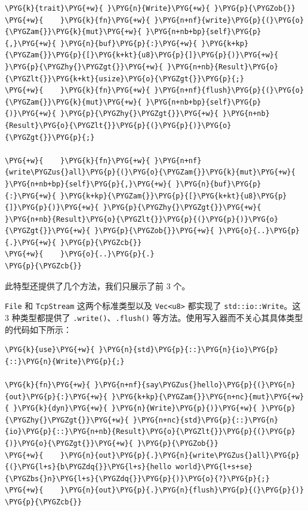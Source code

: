 \begin{Verbatim}[commandchars=\\\{\},breaklines=true,breakanywhere=true,fontsize=\codefont,xleftmargin=17bp]
\PYG{k}{trait}\PYG{+w}{ }\PYG{n}{Write}\PYG{+w}{ }\PYG{p}{\PYGZob{}}
\PYG{+w}{    }\PYG{k}{fn}\PYG{+w}{ }\PYG{n+nf}{write}\PYG{p}{(}\PYG{o}{\PYGZam{}}\PYG{k}{mut}\PYG{+w}{ }\PYG{n+nb+bp}{self}\PYG{p}{,}\PYG{+w}{ }\PYG{n}{buf}\PYG{p}{:}\PYG{+w}{ }\PYG{k+kp}{\PYGZam{}}\PYG{p}{[}\PYG{k+kt}{u8}\PYG{p}{]}\PYG{p}{)}\PYG{+w}{ }\PYG{p}{\PYGZhy{}\PYGZgt{}}\PYG{+w}{ }\PYG{n+nb}{Result}\PYG{o}{\PYGZlt{}}\PYG{k+kt}{usize}\PYG{o}{\PYGZgt{}}\PYG{p}{;}
\PYG{+w}{    }\PYG{k}{fn}\PYG{+w}{ }\PYG{n+nf}{flush}\PYG{p}{(}\PYG{o}{\PYGZam{}}\PYG{k}{mut}\PYG{+w}{ }\PYG{n+nb+bp}{self}\PYG{p}{)}\PYG{+w}{ }\PYG{p}{\PYGZhy{}\PYGZgt{}}\PYG{+w}{ }\PYG{n+nb}{Result}\PYG{o}{\PYGZlt{}}\PYG{p}{(}\PYG{p}{)}\PYG{o}{\PYGZgt{}}\PYG{p}{;}

\PYG{+w}{    }\PYG{k}{fn}\PYG{+w}{ }\PYG{n+nf}{write\PYGZus{}all}\PYG{p}{(}\PYG{o}{\PYGZam{}}\PYG{k}{mut}\PYG{+w}{ }\PYG{n+nb+bp}{self}\PYG{p}{,}\PYG{+w}{ }\PYG{n}{buf}\PYG{p}{:}\PYG{+w}{ }\PYG{k+kp}{\PYGZam{}}\PYG{p}{[}\PYG{k+kt}{u8}\PYG{p}{]}\PYG{p}{)}\PYG{+w}{ }\PYG{p}{\PYGZhy{}\PYGZgt{}}\PYG{+w}{ }\PYG{n+nb}{Result}\PYG{o}{\PYGZlt{}}\PYG{p}{(}\PYG{p}{)}\PYG{o}{\PYGZgt{}}\PYG{+w}{ }\PYG{p}{\PYGZob{}}\PYG{+w}{ }\PYG{o}{..}\PYG{p}{.}\PYG{+w}{ }\PYG{p}{\PYGZcb{}}
\PYG{+w}{    }\PYG{o}{..}\PYG{p}{.}
\PYG{p}{\PYGZcb{}}
\end{Verbatim}

此特型还提供了几个方法，我们只展示了前 3 个。

\texttt{File} 和 \texttt{TcpStream} 这两个标准类型以及 \texttt{Vec<u8>} 都实现了 \texttt{std::io::Write}。这 3 种类型都提供了 \texttt{.write()}、\texttt{.flush()} 等方法。使用写入器而不关心其具体类型的代码如下所示：

\begin{Verbatim}[commandchars=\\\{\},breaklines=true,breakanywhere=true,fontsize=\codefont,xleftmargin=17bp]
\PYG{k}{use}\PYG{+w}{ }\PYG{n}{std}\PYG{p}{::}\PYG{n}{io}\PYG{p}{::}\PYG{n}{Write}\PYG{p}{;}

\PYG{k}{fn}\PYG{+w}{ }\PYG{n+nf}{say\PYGZus{}hello}\PYG{p}{(}\PYG{n}{out}\PYG{p}{:}\PYG{+w}{ }\PYG{k+kp}{\PYGZam{}}\PYG{n+nc}{mut}\PYG{+w}{ }\PYG{k}{dyn}\PYG{+w}{ }\PYG{n}{Write}\PYG{p}{)}\PYG{+w}{ }\PYG{p}{\PYGZhy{}\PYGZgt{}}\PYG{+w}{ }\PYG{n+nc}{std}\PYG{p}{::}\PYG{n}{io}\PYG{p}{::}\PYG{n+nb}{Result}\PYG{o}{\PYGZlt{}}\PYG{p}{(}\PYG{p}{)}\PYG{o}{\PYGZgt{}}\PYG{+w}{ }\PYG{p}{\PYGZob{}}
\PYG{+w}{    }\PYG{n}{out}\PYG{p}{.}\PYG{n}{write\PYGZus{}all}\PYG{p}{(}\PYG{l+s}{b\PYGZdq{}}\PYG{l+s}{hello world}\PYG{l+s+se}{\PYGZbs{}n}\PYG{l+s}{\PYGZdq{}}\PYG{p}{)}\PYG{o}{?}\PYG{p}{;}
\PYG{+w}{    }\PYG{n}{out}\PYG{p}{.}\PYG{n}{flush}\PYG{p}{(}\PYG{p}{)}
\PYG{p}{\PYGZcb{}}
\end{Verbatim}

